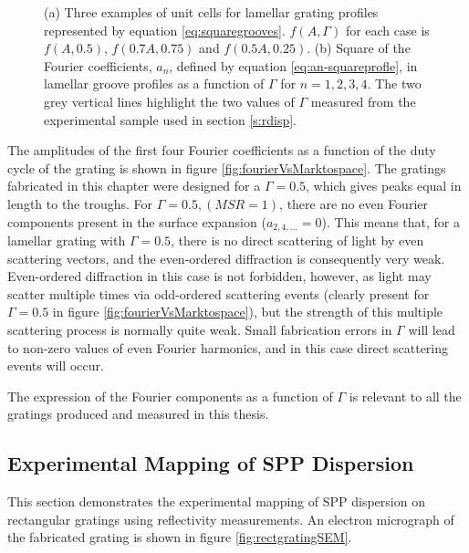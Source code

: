 \begin{figure}
	\begin{center}
	\subfigure[]{\label{fig:examplesRectProfile}}
	\subfigure[]{\label{fig:fourierVsMarktospace}}
	\end{center}
	\caption[Three examples of unit cells for lamellar grating profiles, and the square of the Fourier coefficients, $a_n$, for these groove profiles.]{(a) Three examples of unit cells for lamellar grating profiles represented by equation \ref{eq:squaregrooves}. $f(A,\Gamma)$ for each case is $f(A,0.5)$, \color{red}$f(0.7A,0.75)$ \color{black} and \color{blue}$f(0.5A,0.25)$\color{black}. (b) Square of the Fourier coefficients, $a_n$, defined by equation \ref{eq:an-squareprofle}, in lamellar groove profiles as a function of $\Gamma$ for $n=1,2,3,4$. The two grey vertical lines highlight the two values of $\Gamma$ measured from the experimental sample used in section \ref{s:rdisp}.}
\end{figure}

The amplitudes of the first four Fourier coefficients as a function of the duty cycle of the grating is shown in figure \ref{fig:fourierVsMarktospace}. The gratings fabricated in this chapter were designed for a $\Gamma=0.5$, which gives peaks equal in length to the troughs. For $\Gamma=0.5, (MSR=1)$, there are no even Fourier components present in the surface expansion ($a_{2,4,...}\!\!\!\!=0$). This means that, for a lamellar grating with $\Gamma=0.5$, there is no direct scattering of light by even scattering vectors, and the even-ordered diffraction is consequently very weak. Even-ordered diffraction in this case is not forbidden, however, as light may scatter multiple times via odd-ordered scattering events (clearly present for $\Gamma=0.5$ in figure \ref{fig:fourierVsMarktospace}), but the strength of this multiple scattering process is normally quite weak. Small fabrication errors in $\Gamma$ will lead to non-zero values of even Fourier harmonics, and in this case direct scattering events will occur.

The expression of the Fourier components as a function of $\Gamma$ is relevant to all the gratings produced and measured in this thesis.

\subsection{Experimental Mapping of SPP Dispersion\label{s:rdisp}}
This section demonstrates the experimental mapping of SPP dispersion on rectangular gratings using reflectivity measurements. An electron micrograph of the fabricated grating is shown in figure \ref{fig:rectgratingSEM}. 

